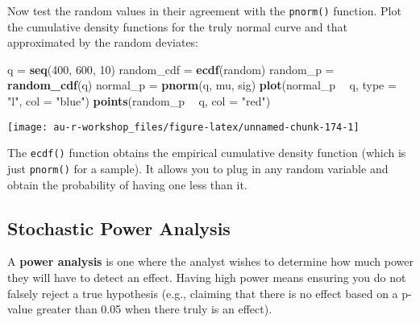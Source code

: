 \documentclass[]{book}
\newenvironment{Shaded}{\begin{snugshade}}{\end{snugshade}}
\newcommand{\KeywordTok}[1]{\textcolor[rgb]{0.13,0.29,0.53}{\textbf{#1}}}
\newcommand{\DataTypeTok}[1]{\textcolor[rgb]{0.13,0.29,0.53}{#1}}
\newcommand{\DecValTok}[1]{\textcolor[rgb]{0.00,0.00,0.81}{#1}}
\newcommand{\StringTok}[1]{\textcolor[rgb]{0.31,0.60,0.02}{#1}}
\newcommand{\OperatorTok}[1]{\textcolor[rgb]{0.81,0.36,0.00}{\textbf{#1}}}
\newcommand{\NormalTok}[1]{#1}
\theoremstyle{definition}
\theoremstyle{definition}
\theoremstyle{definition}
\theoremstyle{remark}
\begin{document}
Now test the random values in their agreement with the \texttt{pnorm()}
function. Plot the cumulative density functions for the truly normal
curve and that approximated by the random deviates:

\begin{Shaded}
\begin{Highlighting}[]
\NormalTok{q =}\StringTok{ }\KeywordTok{seq}\NormalTok{(}\DecValTok{400}\NormalTok{, }\DecValTok{600}\NormalTok{, }\DecValTok{10}\NormalTok{)}
\NormalTok{random_cdf =}\StringTok{ }\KeywordTok{ecdf}\NormalTok{(random)}
\NormalTok{random_p =}\StringTok{ }\KeywordTok{random_cdf}\NormalTok{(q)}
\NormalTok{normal_p =}\StringTok{ }\KeywordTok{pnorm}\NormalTok{(q, mu, sig)}
\KeywordTok{plot}\NormalTok{(normal_p }\OperatorTok{~}\StringTok{ }\NormalTok{q, }\DataTypeTok{type =} \StringTok{"l"}\NormalTok{, }\DataTypeTok{col =} \StringTok{"blue"}\NormalTok{)}
\KeywordTok{points}\NormalTok{(random_p }\OperatorTok{~}\StringTok{ }\NormalTok{q, }\DataTypeTok{col =} \StringTok{"red"}\NormalTok{)}
\end{Highlighting}
\end{Shaded}

\begin{center}\texttt{[image: au-r-workshop\_files/figure-latex/unnamed-chunk-174-1]} \end{center}

The \texttt{ecdf()} function obtains the empirical cumulative density
function (which is just \texttt{pnorm()} for a sample). It allows you to
plug in any random variable and obtain the probability of having one
less than it.

\subsection{Stochastic Power Analysis}\label{power-ex}

A \textbf{power analysis} is one where the analyst wishes to determine
how much power they will have to detect an effect. Having high power
means ensuring you do not falsely reject a true hypothesis (e.g.,
claiming that there is no effect based on a p-value greater than 0.05
when there truly is an effect).
\end{document}

